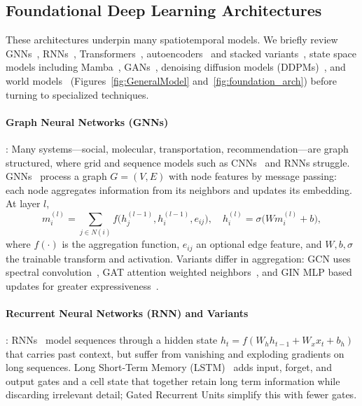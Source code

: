 \documentclass[journal]{IEEEtran}
\begin{document}
\subsection{Foundational Deep Learning Architectures }
These architectures underpin many spatiotemporal models. We briefly review GNNs~\cite{scarselli2009gnn}, RNNs~\cite{rumelhart1986rnn}, Transformers~\cite{vaswani2017attention}, autoencoders~\cite{hinton2006reducing} and stacked variants~\cite{masci2011stacked}, state space models including Mamba~\cite{gu2023mamba}, GANs~\cite{goodfellow2014gan}, denoising diffusion models (DDPMs)~\cite{ho2020ddpm}, and world models~\cite{maes2026leworldmodel} (Figures~\ref{fig:GeneralModel} and~\ref{fig:foundation_arch}) before turning to specialized techniques.


\paragraph{Graph Neural Networks (GNNs)}: Many systems---social, molecular, transportation, recommendation---are graph structured, where grid and sequence models such as CNNs~\cite{lecun1998cnn} and RNNs struggle. GNNs~\cite{scarselli2009gnn} process a graph $G=(V,E)$ with node features by message passing: each node aggregates information from its neighbors and updates its embedding. At layer $l$,
\begin{equation}
m_i^{(l)} = \sum_{j \in N(i)} f\bigl(h_j^{(l-1)}, h_i^{(l-1)}, e_{ij}\bigr), \quad h_i^{(l)} = \sigma\bigl(W m_i^{(l)} + b\bigr),
\end{equation}
where $f(\cdot)$ is the aggregation function, $e_{ij}$ an optional edge feature, and $W,b,\sigma$ the trainable transform and activation. Variants differ in aggregation: GCN uses spectral convolution~\cite{kipf2017gcn}, GAT attention weighted neighbors~\cite{velickovic2018gat}, and GIN MLP based updates for greater expressiveness~\cite{xu2019gin}.

\paragraph{Recurrent Neural Networks (RNN) and Variants}: RNNs~\cite{rumelhart1986rnn} model sequences through a hidden state $h_t = f(W_h h_{t-1} + W_x x_t + b_h)$ that carries past context, but suffer from vanishing and exploding gradients on long sequences. Long Short-Term Memory (LSTM)~\cite{rnn_lstm} adds input, forget, and output gates and a cell state that together retain long term information while discarding irrelevant detail; Gated Recurrent Units simplify this with fewer gates.
\end{document}
